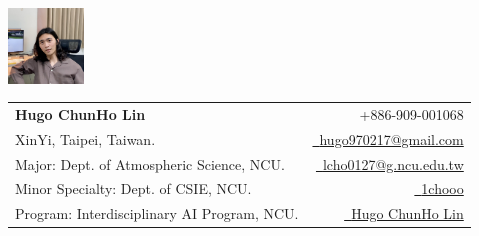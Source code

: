 \documentclass[a4paper,11pt]{article}
\makeatletter
\newcommand{\resumeSubheading}[4]{
\vspace{0.5mm}\item
    \begin{tabular*}{0.98\textwidth}[t]{l@{\extracolsep{\fill}}r}
        \textbf{#1} & \textit{\footnotesize{#4}} \\
        \textit{\footnotesize{#3}} &  \footnotesize{#2}\\
    \end{tabular*}
    \vspace{-2.4mm}
}
\newcommand{\resumeSubHeadingListStart}{\begin{itemize}[leftmargin=*,labelsep=0mm]}
\newcommand{\resumeSubHeadingListEnd}{\end{itemize}\vspace{2mm}}
\newcommand{\name}{Hugo ChunHo Lin} %
\newcommand{\course}{Dept. of Atmospheric Science, NCU.} %
\newcommand{\phone}{909-001068} %
\newcommand{\emaila}{hugo970217@gmail.com} %
\newcommand{\emailb}{lcho0127@g.ncu.edu.tw} %
\makeatother
\begin{document}
\selectfont


\parbox{2.35cm}{%
\includegraphics[width=2cm,clip]{IMG_4754.jpg}
}
\parbox{\dimexpr\linewidth-2.8cm\relax}{
\begin{tabularx}{\linewidth}{L r} \\
  \textbf{\Large \name} & {\raisebox{0.0\height}{\footnotesize \faPhone}\ +886-\phone}\\
  XinYi, Taipei, Taiwan. & \href{mailto:\emaila}{\raisebox{0.0\height}{\footnotesize \faEnvelope}\ {\emaila}} \\
  Major: \course &  \href{mailto:\emailb}{\raisebox{0.0\height}{\footnotesize \faEnvelope}\ {\emailb}}\\
  {Minor Specialty: Dept. of CSIE, NCU.} &  \href{https://github.com/1chooo}{\raisebox{0.0\height}{\footnotesize \faGithub}\ {1chooo}} \\
  {Program: Interdisciplinary AI Program, NCU.} & \href{https://www.linkedin.com/in/1chooo/}{\raisebox{0.0\height}{\footnotesize \faLinkedin}\ {Hugo ChunHo Lin}}
\end{tabularx}
}




  
%

\end{document}
